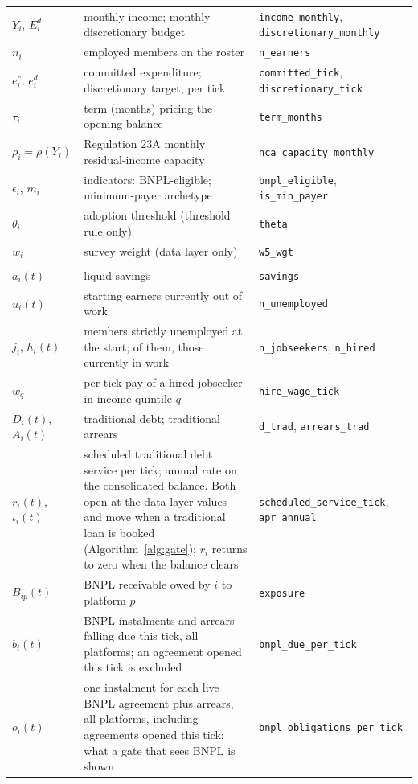 \begin{longtable}{L{2.4cm}L{7.2cm}H{3.8cm}}
$Y_i$, $E^d_i$ & monthly income; monthly discretionary budget & \texttt{income\_monthly}, \texttt{discretionary\_monthly} \\
$n_i$ & employed members on the roster & \texttt{n\_earners} \\
$e^c_i$, $e^d_i$ & committed expenditure; discretionary target, per tick & \texttt{committed\_tick}, \texttt{discretionary\_tick} \\
$\tau_i$ & term (months) pricing the opening balance & \texttt{term\_months} \\
$\rho_i = \rho(Y_i)$ & Regulation 23A monthly residual-income capacity & \texttt{nca\_capacity\_monthly} \\
$\epsilon_i$, $m_i$ & indicators: \ac{BNPL}-eligible; minimum-payer archetype & \texttt{bnpl\_eligible}, \texttt{is\_min\_payer} \\
$\theta_i$ & adoption threshold (threshold rule only) & \texttt{theta} \\
$w_i$ & survey weight (data layer only) & \texttt{w5\_wgt} \\
\addlinespace
{} \\
$a_i(t)$ & liquid savings & \texttt{savings} \\
$u_i(t)$ & starting earners currently out of work & \texttt{n\_unemployed} \\
$j_i$, $h_i(t)$ & members strictly unemployed at the start; of them, those currently in work & \texttt{n\_jobseekers}, \texttt{n\_hired} \\
$\bar{w}_{q}$ & per-tick pay of a hired jobseeker in income quintile $q$ & \texttt{hire\_wage\_tick} \\
$D_i(t)$, $A_i(t)$ & traditional debt; traditional arrears & \texttt{d\_trad}, \texttt{arrears\_trad} \\
$r_i(t)$, $\iota_i(t)$ & scheduled traditional debt service per tick; annual rate on the consolidated balance. Both open at the data-layer values and move when a traditional loan is booked (Algorithm~\ref{alg:gate}); $r_i$ returns to zero when the balance clears & \texttt{scheduled\_service\_tick}, \texttt{apr\_annual} \\
$B_{ip}(t)$ & \ac{BNPL} receivable owed by $i$ to platform $p$ & \texttt{exposure} \\
$b_i(t)$ & \ac{BNPL} instalments and arrears falling due this tick, all platforms; an agreement opened this tick is excluded & \texttt{bnpl\_due\_per\_tick} \\
$o_i(t)$ & one instalment for each live \ac{BNPL} agreement plus arrears, all platforms, including agreements opened this tick; what a gate that sees \ac{BNPL} is shown & \texttt{bnpl\_obligations\_per\_tick} \\

\end{longtable}
